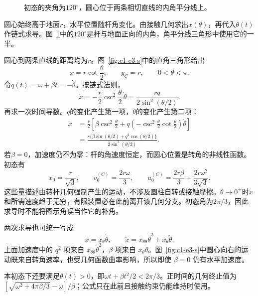 \begin{figure}[H]\centering
{}
\caption{初态的夹角为$120^\circ$，圆心位于两条相切直线的内角平分线上。}\label{fig:c1-e3-q}
\end{figure}
\begin{solution}
圆心始终高于地面$r$，水平位置随杆角变化。由接触几何求出$x(\theta)$，再代入$\theta(t)$作链式求导。图~\ref{fig:c1-e3-q}中的$120^\circ$是杆与地面正向的内角，角平分线三角形中使用它的一半。


圆心到两条直线的距离均为$r$。图~\ref{fig:c1-e3-s}中的直角三角形给出
\[x=r\cot\frac\theta2,\qquad y_C=r,\qquad 0<\theta<\pi.\]
令$q(t)=\omega+\beta t=-\dot\theta$。按链式法则，
\[\dot x=-\frac r2\csc^2\frac\theta2\,\dot\theta
=\frac{rq}{2\sin^2(\theta/2)}.\]
再求一次时间导数。$q$的变化产生第一项，$\theta$的变化产生第二项：
\begin{align*}
\ddot x&=\frac r2\left[\beta\csc^2\frac\theta2
+q\left(-\csc^2\frac\theta2\cot\frac\theta2\right)\dot\theta\right]\\
&=\boxed{\frac{r\{\beta\sin(\theta/2)+q^2\cos(\theta/2)\}}{2\sin^3(\theta/2)}}.
\end{align*}
若$\beta=0$，加速度仍不为零：杆的角速度恒定，而圆心位置是转角的非线性函数。初态有
\[x_0=\frac r{\sqrt3},\qquad v_0^{(C)}=\frac{2r\omega}{3},\qquad
a_0^{(C)}=\frac{2r\beta}{3}+\frac{2r\omega^2}{3\sqrt3}.\]
这些量描述由转杆几何强制产生的运动，不涉及圆柱自转或接触摩擦。$\theta\to0^+$时$x$和所需速度趋于无穷，有限装置必在此前离开该几何分支。初态角为$2\pi/3$，因此求导时不能将图示角误当作它的补角。


两次求导也可统一写成
\[\dot x=x_\theta\dot\theta,\qquad
\ddot x=x_{\theta\theta}\dot\theta^2+x_\theta\ddot\theta.\]
上面加速度中的 $q^2$ 项来自 $x_{\theta\theta}\dot\theta^2$，$\beta$ 项来自 $x_\theta\ddot\theta$。图~\ref{fig:c1-e3-s}中圆心向右的运动既来自转角速率，也受几何函数曲率影响，所以即使 $\beta=0$ 仍有水平加速度。

本初态下还要满足$\theta(t)>0$，即$\omega t+\beta t^2/2<2\pi/3$。正时间的几何终止值为$[\sqrt{\omega^2+4\pi\beta/3}-\omega]/\beta$；公式只在此前且接触约束仍能维持时使用。


\end{solution}
